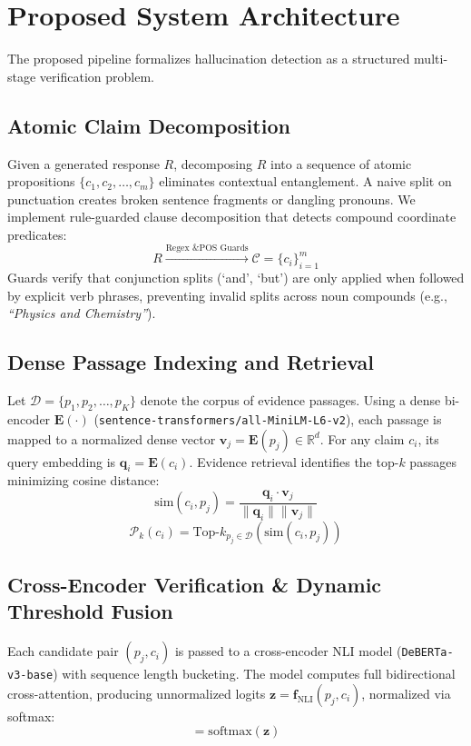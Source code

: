 \documentclass[conference]{IEEEtran}
\begin{document}
\section{Proposed System Architecture}
The proposed pipeline formalizes hallucination detection as a structured multi-stage verification problem.

\subsection{Atomic Claim Decomposition}
Given a generated response $R$, decomposing $R$ into a sequence of atomic propositions $\{c_1, c_2, \dots, c_m\}$ eliminates contextual entanglement. A naive split on punctuation creates broken sentence fragments or dangling pronouns. We implement rule-guarded clause decomposition that detects compound coordinate predicates:
\begin{equation}
R \xrightarrow{\text{Regex \& POS Guards}} \mathcal{C} = \{c_i\}_{i=1}^m
\end{equation}
Guards verify that conjunction splits (`and', `but') are only applied when followed by explicit verb phrases, preventing invalid splits across noun compounds (e.g., \textit{``Physics and Chemistry''}).

\subsection{Dense Passage Indexing and Retrieval}
Let $\mathcal{D} = \{p_1, p_2, \dots, p_K\}$ denote the corpus of evidence passages. Using a dense bi-encoder $\mathbf{E}(\cdot)$ (\texttt{sentence-transformers/all-MiniLM-L6-v2}), each passage is mapped to a normalized dense vector $\mathbf{v}_j = \mathbf{E}(p_j) \in \mathbb{R}^d$. For any claim $c_i$, its query embedding is $\mathbf{q}_i = \mathbf{E}(c_i)$. Evidence retrieval identifies the top-$k$ passages minimizing cosine distance:
\begin{equation}
\text{sim}(c_i, p_j) = \frac{\mathbf{q}_i \cdot \mathbf{v}_j}{\|\mathbf{q}_i\| \|\mathbf{v}_j\|}
\end{equation}
\begin{equation}
\mathcal{P}_k(c_i) = \text{Top-}k_{p_j \in \mathcal{D}} \left( \text{sim}(c_i, p_j) \right)
\end{equation}

\subsection{Cross-Encoder Verification \& Dynamic Threshold Fusion}
Each candidate pair $(p_j, c_i)$ is passed to a cross-encoder NLI model (\texttt{DeBERTa-v3-base}) with sequence length bucketing. The model computes full bidirectional cross-attention, producing unnormalized logits $\mathbf{z} = \mathbf{f}_{\text{NLI}}(p_j, c_i)$, normalized via softmax:
\begin{equation}
[P(\text{ent}), P(\text{contra}), P(\text{neu})] = \text{softmax}(\mathbf{z})
\end{equation}
\end{document}
